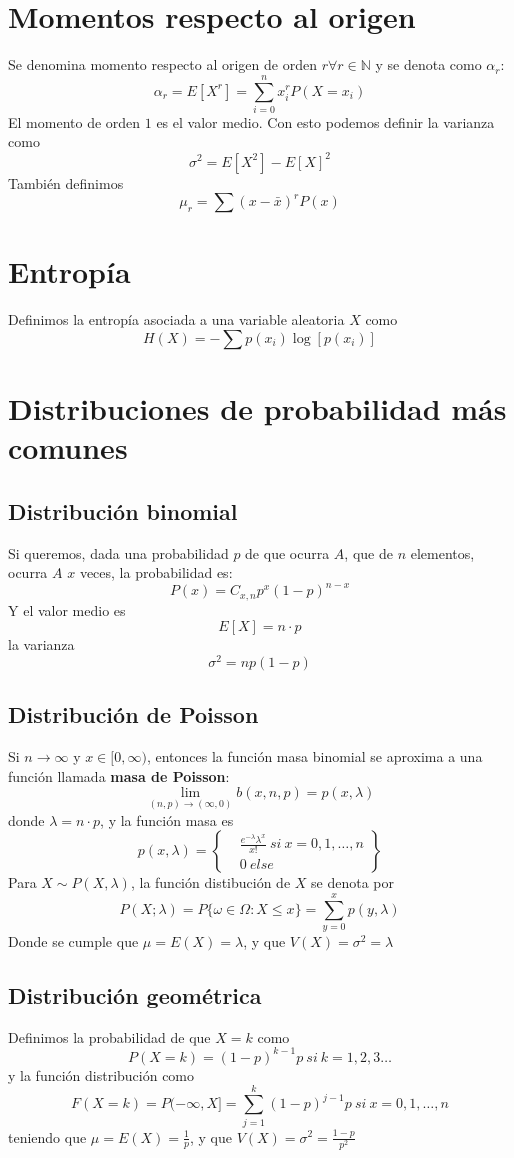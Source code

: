 \documentclass{./Probabilidad.tex}
\begin{document}
\section{Momentos respecto al origen}
Se denomina momento respecto al origen de orden $r \forall r \in \mathbb{N}$ y se denota como $\alpha_{r}$:
$$
\alpha_{r}=E[X^{r}] = \sum_{i=0}^{n} x_{i}^{r}P(X=x_{i})
$$
El momento de orden $1$ es el valor medio. Con esto podemos definir la varianza como
$$
\sigma^{2}=E[X^{2}]-E[X]^{2}
$$
También definimos
$$
\mu_{r} = \sum(x-\bar{x})^rP(x)
$$
\section{Entropía}
Definimos la entropía asociada a una variable aleatoria $X$ como
$$
H(X)= -\sum p(x_{i}) \log[p(x_{i})]
$$
\section{Distribuciones de probabilidad más comunes}
\subsection{Distribución binomial}
Si queremos, dada una probabilidad $p$ de que ocurra $A$, que de $n$ elementos, ocurra $A$ $x$ veces, la probabilidad es:     
\[
	P(x) = C_{x,n}p^{x}(1-p)^{n-x}
\]
Y el valor medio es
\[
	E[X] = n\cdot p
\]
la varianza
\[
	\sigma ^{2}= np(1-p)
\]
\subsection{Distribución de Poisson}
Si $n \to \infty$ y $x \in [0, \infty)$, entonces la función masa binomial se aproxima a una función llamada \textbf{masa de Poisson}:
\[
	\lim_{(n,p) \to (\infty,0)} b(x,n,p)=p(x,\lambda) 
\]
donde $\lambda = n\cdot p$, y la función masa es
\[
	p(x,\lambda) = \left\{
		\begin{matrix}
			&\frac{e^{-\lambda} \lambda^{x}}{x!}~si~x=0,1,\dots ,n\\
			&0~else
	\end{matrix}\right\}
\]
Para $X\sim P(X,\lambda)$, la función distibución de $X$ se denota por
\[
	P(X;\lambda)=P \{ \omega \in \Omega : X \leq x\} = \sum_{y=0}^{x} p(y,\lambda)
\]
Donde se cumple que $\mu = E(X) = \lambda$, y que $V(X) = \sigma ^{2} = \lambda$ 
\subsection{Distribución geométrica}
Definimos la probabilidad de que $X=k$ como
\[
	P(X=k)=(1-p)^{k-1}p~si~k=1,2,3\dots 
\]
y la función distribución como
\[
	F(X=k)=P(-\infty,X]= \sum_{j=1}^{k} (1-p)^{j-1}p~si~x=0,1,\dots ,n
\]
teniendo que $\mu=E(X)=\frac{1}{p}$, y que $V(X)=\sigma ^{2}= \frac{1-p}{p ^{2}}$
\end{document}
